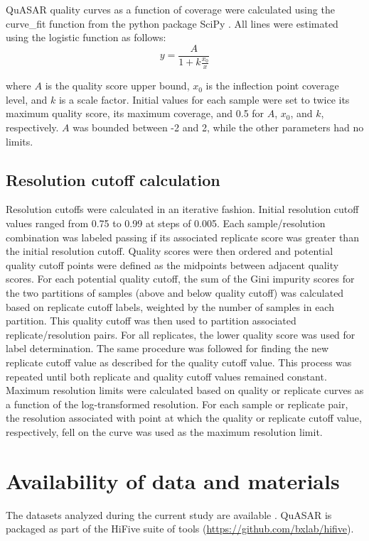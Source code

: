 QuASAR quality curves as a function of coverage were calculated using the curve\_fit function from the python package SciPy \cite{walt_numpy_2011}. All lines were estimated using the logistic function as follows:
\[y=\frac{A}{1+k\frac{x_0}{x}}\]

where $A$ is the quality score upper bound, $x_0$ is the inflection point coverage level, and $k$ is a scale factor. Initial values for each sample were set to twice its maximum quality score, its maximum coverage, and 0.5 for $A$, $x_0$, and $k$, respectively. $A$ was bounded between -2 and 2, while the other parameters had no limits.

\subsection{Resolution cutoff calculation}

Resolution cutoffs were calculated in an iterative fashion. Initial resolution cutoff values ranged from 0.75 to 0.99 at steps of 0.005. Each sample/resolution combination was labeled passing if its associated replicate score was greater than the initial resolution cutoff. Quality scores were then ordered and potential quality cutoff points were defined as the midpoints between adjacent quality scores. For each potential quality cutoff, the sum of the Gini impurity scores for the two partitions of samples (above and below quality cutoff) was calculated based on replicate cutoff labels, weighted by the number of samples in each partition. This quality cutoff was then used to partition associated replicate/resolution pairs. For all replicates, the lower quality score was used for label determination. The same procedure was followed for finding the new replicate cutoff value as described for the quality cutoff value. This process was repeated until both replicate and quality cutoff values remained constant. Maximum resolution limits were calculated based on quality or replicate curves as a function of the log-transformed resolution. For each sample or replicate pair, the resolution associated with point at which the quality or replicate cutoff value, respectively, fell on the curve was used as the maximum resolution limit.

\section{Availability of data and materials}

The datasets analyzed during the current study are available . QuASAR is packaged as part of the HiFive suite of tools (\url{https://github.com/bxlab/hifive}).

